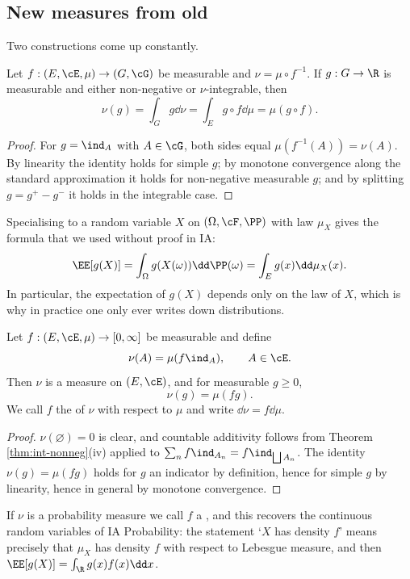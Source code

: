 \subsection{New measures from old}

Two constructions come up constantly.

\begin{proposition}\label{prop:change-var}
	Let $f : (E,\cE,\mu)\to(G,\cG)$ be measurable and $\nu = \mu\circ f^{-1}$. If $g : G \to \R$ is measurable and either non-negative or $\nu$-integrable, then
	$$
	\nu(g) = \int_G g\dd\nu = \int_E g\circ f\dd\mu = \mu(g \circ f).
	$$
\end{proposition}
\begin{proof}
	For $g = \ind_A$ with $A \in \cG$, both sides equal $\mu(f^{-1}(A)) = \nu(A)$. By linearity the identity holds for simple $g$; by monotone convergence along the standard approximation it holds for non-negative measurable $g$; and by splitting $g = g^+-g^-$ it holds in the integrable case.
\end{proof}

Specialising to a random variable $X$ on $(\Omega,\cF,\PP)$ with law $\mu_X$ gives the formula that we used without proof in IA:
$$
\EE[g(X)] = \int_\Omega g(X(\omega))\dd\PP(\omega) = \int_E g(x)\dd\mu_X(x).
$$
In particular, the expectation of $g(X)$ depends only on the law of $X$, which is why in practice one only ever writes down distributions.

\begin{proposition}\label{prop:density}
	Let $f : (E,\cE,\mu)\to[0,\infty]$ be measurable and define
	$$
	\nu(A) = \mu(f\ind_A), \qquad A \in \cE.
	$$
	Then $\nu$ is a measure on $(E,\cE)$, and for measurable $g \geq 0$,
	$$
	\nu(g) = \mu(fg).
	$$
	We call $f$ the  of $\nu$ with respect to $\mu$ and write $\dd\nu = f\dd\mu$.
\end{proposition}
\begin{proof}
	$\nu(\varnothing)=0$ is clear, and countable additivity follows from Theorem \ref{thm:int-nonneg}(iv) applied to $\sum_n f\ind_{A_n} = f\ind_{\bigsqcup A_n}$. The identity $\nu(g)=\mu(fg)$ holds for $g$ an indicator by definition, hence for simple $g$ by linearity, hence in general by monotone convergence.
\end{proof}

If $\nu$ is a probability measure we call $f$ a , and this recovers the continuous random variables of IA Probability: the statement `$X$ has density $f$' means precisely that $\mu_X$ has density $f$ with respect to Lebesgue measure, and then $\EE[g(X)] = \int_\R g(x)f(x)\dd x$.

